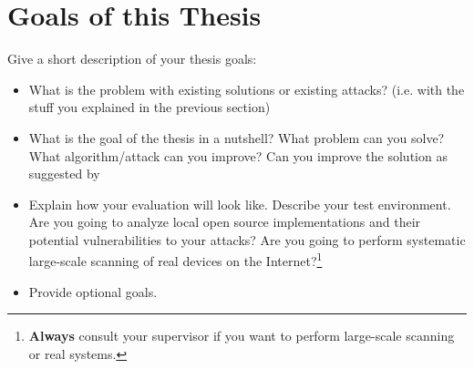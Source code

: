 \chapter{Goals of this Thesis} \label{chap:goals}

Give a short description of your thesis goals:

\begin{itemize}
	\item What is the problem with existing solutions or existing attacks? (i.e. with the stuff you explained in the previous section)
	\item What is the goal of the thesis in a nutshell? What problem can you solve? What algorithm/attack can you improve? Can you improve the solution as suggested by
	\item Explain how your evaluation will look like. Describe your test environment. Are you going to analyze local open source implementations and their potential vulnerabilities to your attacks? Are you going to perform systematic large-scale scanning of real devices on the Internet?\footnote{\textbf{Always} consult your supervisor if you want to perform large-scale scanning or real systems.}
	\item Provide optional goals.
\end{itemize}